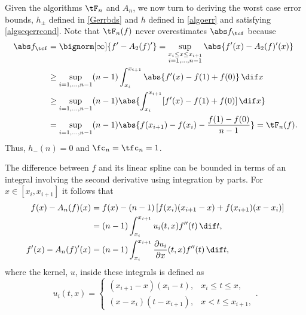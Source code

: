Given the algorithms $\tF_n$ and $A_n$, we now turn to deriving the worst case error bounds, $h_{\pm}$ defined in \eqref{Gerrbds} and $h$ defined in \eqref{algoerr} and satisfying \eqref{algseqerrcond}.
Note that $\tF_{n}(f)$ never overestimates $\Ftnorm{f}$ because
\begin{align*}
\Ftnorm{f} &  = \bignorm[\infty]{f'-A_2(f)'}
= \sup_{\substack{x_i \le x \le x_{i+1}\\ i=1, \ldots, n-1 }} \abs{f'(x) - A_2(f)'(x)} \\
&\ge \sup_{i=1, \ldots, n-1} (n-1)\int_{x_i}^{x_{i+1}} \abs{f'(x) - f(1)+f(0)} \, \dif x \\
&\ge \sup_{i=1, \ldots, n-1} (n-1)\abs{\int_{x_i}^{x_{i+1}} [f'(x) - f(1)+f(0)] \, \dif x }\\
&= \sup_{i=1, \ldots, n-1} (n-1)\abs{f(x_{i+1})-f(x_i) - \frac{f(1)-f(0)}{n-1}} = \tF_n(f).
\end{align*}
Thus, $h_{-}(n)=0$ and $\fc_n=\tfc_n=1$.

The difference between $f$ and its linear spline can be bounded in terms of an integral involving the second derivative using integration by parts.  For $x \in [x_i,x_{i+1}]$ it follows that
\begin{align}
\nonumber
f(x)-A_n (f)(x)
&= f(x) - (n-1) \left[f(x_{i})(x_{i+1}-x) +f(x_{i+1})(x-x_i) \right]\\
& = (n-1) \int_{x_i}^{x_{i+1}} u_i(t,x) f''(t) \, \dif t, \label{fintermsfdoubprime}\\
f'(x)-A_n(f)'(x) & = (n-1) \int_{x_i}^{x_{i+1}} \frac{\partial u_i}{\partial x}(t,x) f''(t) \, \dif t, \label{fprimeintermsfdoubprime}
\end{align}
where the kernel, $u$, inside these integrals is defined as
\begin{equation*}
u_i(t,x) =\begin{cases} (x_{i+1}-x)(x_i-t), & x_i\leq t\leq x,\\
(x-x_{i})(t- x_{i+1}), & x< t \leq x_{i+1},
\end{cases}.
\end{equation*}

